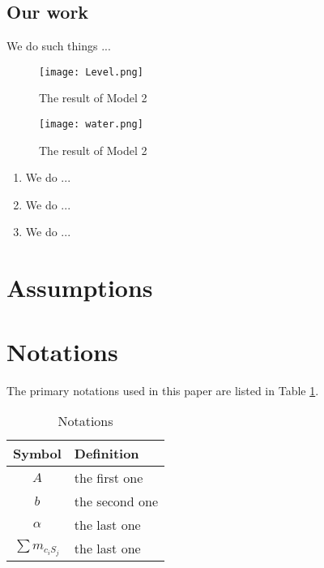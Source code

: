 \documentclass[12pt]{article}  %
\begin{document}
\subsection{Our work}
We do such things ...

\begin{figure}[htbp]
	\centering
	\texttt{[image: Level.png]}
	\caption{The result of Model 2}\label{fig:result}
\end{figure}
\begin{figure}[htbp]
	\centering
	\texttt{[image: water.png]}
	\caption{The result of Model 2}\label{fig:result}
\end{figure}
\begin{enumerate}[\bfseries 1.]
    \item We do ...
    \item We do ...
    \item We do ...
\end{enumerate}

\section{Assumptions}


\section{Notations}
The primary notations used in this paper are listed in Table \ref{tb:notation}.

\begin{table}[!htbp]
\begin{center}
\caption{Notations}
\begin{tabular}{cl}
	\toprule
	\multicolumn{1}{m{3cm}}{\centering Symbol}
	&\multicolumn{1}{m{8cm}}{\centering Definition}\\
	\midrule
	$A$&the first one\\
	$b$&the second one\\
	$\alpha$ &the last one\\
	$\sum m_{c_{i} S_{j}}$ &the last one\\
	\bottomrule
\end{tabular}\label{tb:notation}
\end{center}
\end{table}
\end{document}

